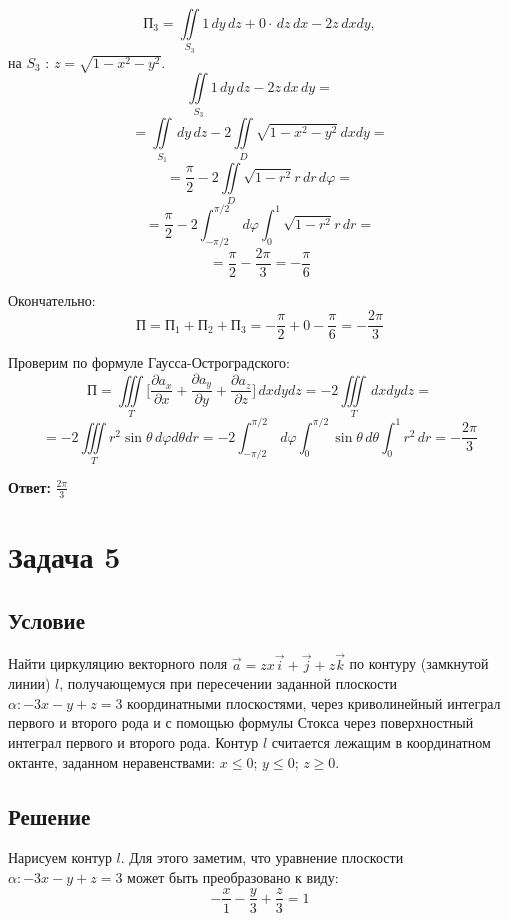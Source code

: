 \documentclass[12pt]{article}
\begin{document}
	$$ П_3 = \iint \limits_{S_3} 1 \, dy \, dz + 0 \cdot \, dz \, dx - 2z \, dx dy ,$$
	на $ S_3 $ : $ z = \sqrt{1 - x^2 - y^2} $.	
	$$ \iint \limits_{S_3} 1 \, dy \, dz - 2z \, dx \, dy = $$
	$$ = \iint \limits_{S_1} \, dy \, dz - 2 \iint \limits_D \sqrt{1 - x^2 - y^2} \, dx dy = $$
	$$ = \frac{\pi}{2} - 2 \iint \limits_D \sqrt{1 - r^2} r \, dr \, d\varphi = $$
	$$ = \frac{\pi}{2} - 2 \int_{-\pi/2}^{\pi/2} \, d\varphi \int_0^1 \sqrt{1 - r^2} r \, dr = $$
	$$ = \frac{\pi}{2} - \frac{2\pi}{3} = - \frac{\pi}{6} $$

	Окончательно:
	$$ П = П_1 + П_2 + П_3 = - \frac{\pi}{2} + 0 - \frac{\pi}{6}  = - \frac{2\pi}{3} $$

	Проверим по формуле Гаусса-Остроградского:
	$$ П = \iiint \limits_T \Big[ \frac{\partial a_x}{\partial x} + \frac{\partial a_y}{\partial y} + \frac{\partial a_z}{\partial z} \Big] \, dx dy dz = -2 \iiint \limits_T  \, dx dy dz = $$
	$$ = -2 \iiint \limits_T r^2 \sin{\theta} \, d\varphi d\theta dr = - 2 \int_ {-\pi/2}^{\pi/2} \, d\varphi \int_ {0}^{\pi/2} \sin{\theta} \, d\theta \int_0^1 r^2 \, dr = - \frac{2\pi}{3} $$

	\hspace{290pt}\textbf{Ответ:} $ \frac{2\pi}{3} $	
	\newpage
	\section*{Задача 5}	
	\subsection*{Условие}
	 
	Найти циркуляцию  векторного поля $ \vec{a} = z x \vec{i} + \vec{j} + z \vec{k} $ по контуру (замкнутой линии) $ l $, получающемуся при пересечении заданной плоскости $ \alpha : - 3x - y + z = 3$ координатными плоскостями, через криволинейный интеграл первого и второго рода и с помощью формулы Стокса через поверхностный интеграл первого и второго рода. Контур $ l $ считается лежащим в координатном октанте, заданном неравенствами: $ x \leq 0; \, y \leq 0; \, z \geq 0 $. 

	\subsection*{Решение}
			
	Нарисуем контур $ l $. Для этого заметим, что уравнение плоскости $ \alpha : - 3x - y + z = 3$ может быть преобразовано к виду:
	$$ - \frac{x}{1} - \frac{y}{3} + \frac{z}{3} = 1$$
\end{document}
